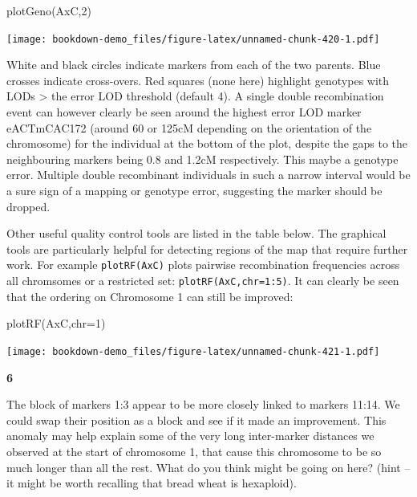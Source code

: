 \documentclass[
]{book}
\makeatletter
\newenvironment{Shaded}{\begin{snugshade}}{\end{snugshade}}
\newcommand{\AttributeTok}[1]{\textcolor[rgb]{0.77,0.63,0.00}{#1}}
\newcommand{\DecValTok}[1]{\textcolor[rgb]{0.00,0.00,0.81}{#1}}
\newcommand{\FunctionTok}[1]{\textcolor[rgb]{0.00,0.00,0.00}{#1}}
\newcommand{\NormalTok}[1]{#1}
\newenvironment{kframe}{%
\medskip{}
\setlength{\fboxsep}{.8em}
 \def\at@end@of@kframe{}%
 \ifinner\ifhmode%
  \def\at@end@of@kframe{\end{minipage}}%
  \begin{minipage}{\columnwidth}%
 \fi\fi%
 \def\FrameCommand##1{\hskip\@totalleftmargin \hskip-\fboxsep
 \colorbox{shadecolor}{##1}\hskip-\fboxsep
     \hskip-\linewidth \hskip-\@totalleftmargin \hskip\columnwidth}%
 \MakeFramed {\advance\hsize-\width
   \@totalleftmargin\z@ \linewidth\hsize
   \@setminipage}}%
 {\par\unskip\endMakeFramed%
 \at@end@of@kframe}
\newenvironment{rmdblock}[1]
  {
  \begin{itemize}
  \renewcommand{\labelitemi}{
    \raisebox{-.7\height}[0pt][0pt]{
      {\setkeys{Gin}{width=3em,keepaspectratio}\texttt{[image: images/\#1]}}
    }
  }
  \setlength{\fboxsep}{1em}
  \begin{kframe}
  \item
  }
  {
  \end{kframe}
  \end{itemize}
  }
\newenvironment{rmdquiz}
  {\begin{rmdblock}{quiz}}
  {\end{rmdblock}}
\makeatother
\begin{document}
\begin{Shaded}
\begin{Highlighting}[]
\FunctionTok{plotGeno}\NormalTok{(AxC,}\DecValTok{2}\NormalTok{)}
\end{Highlighting}
\end{Shaded}

\texttt{[image: bookdown-demo\_files/figure-latex/unnamed-chunk-420-1.pdf]}

White and black circles indicate markers from each of the two parents. Blue crosses indicate cross-overs. Red squares (none here) highlight genotypes with LODs \textgreater{} the error LOD threshold (default 4). A single double recombination event can however clearly be seen around the highest error LOD marker eACTmCAC172 (around 60 or 125cM depending on the orientation of the chromosome) for the individual at the bottom of the plot, despite the gaps to the neighbouring markers being 0.8 and 1.2cM respectively. This maybe a genotype error. Multiple double recombinant individuals in such a narrow interval would be a sure sign of a mapping or genotype error, suggesting the marker should be dropped.

Other useful quality control tools are listed in the table below. The graphical tools are particularly helpful for detecting regions of the map that require further work. For example \texttt{plotRF(AxC)} plots pairwise recombination frequencies across all chromsomes or a restricted set: \texttt{plotRF(AxC,chr=1:5)}. It can clearly be seen that the ordering on Chromosome 1 can still be improved:

\begin{Shaded}
\begin{Highlighting}[]
\FunctionTok{plotRF}\NormalTok{(AxC,}\AttributeTok{chr=}\DecValTok{1}\NormalTok{)}
\end{Highlighting}
\end{Shaded}

\texttt{[image: bookdown-demo\_files/figure-latex/unnamed-chunk-421-1.pdf]}

\begin{rmdquiz}
\textbf{6}

The block of markers 1:3 appear to be more closely linked to markers 11:14. We could swap their position as a block and see if it made an improvement. This anomaly may help explain some of the very long inter-marker distances we observed at the start of chromosome 1, that cause this chromosome to be so much longer than all the rest. What do you think might be going on here? (hint -- it might be worth recalling that bread wheat is hexaploid).
\end{rmdquiz}
\end{document}
